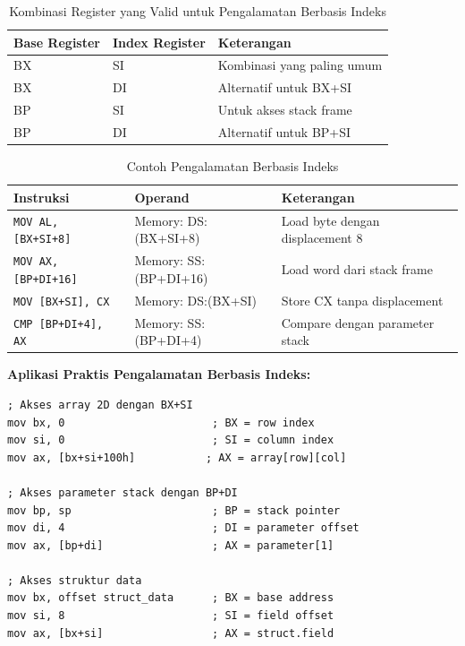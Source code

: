 \documentclass[../main.tex]{subfiles}
\begin{document}
\begin{table}[h]
\centering
\caption{Kombinasi Register yang Valid untuk Pengalamatan Berbasis Indeks}
\begin{tabular}{|p{3cm}|p{3cm}|p{9cm}|}
\hline
\textbf{Base Register} & \textbf{Index Register} & \textbf{Keterangan} \\
\hline
BX & SI & Kombinasi yang paling umum \\
\hline
BX & DI & Alternatif untuk BX+SI \\
\hline
BP & SI & Untuk akses stack frame \\
\hline
BP & DI & Alternatif untuk BP+SI \\
\hline
\end{tabular}
\label{tab:indexed-addressing-combinations}
\end{table}

\begin{table}[h]
\centering
\caption{Contoh Pengalamatan Berbasis Indeks}
\begin{tabular}{|p{4cm}|p{4cm}|p{7cm}|}
\hline
\textbf{Instruksi} & \textbf{Operand} & \textbf{Keterangan} \\
\hline
\texttt{MOV AL, [BX+SI+8]} & Memory: DS:(BX+SI+8) & Load byte dengan displacement 8 \\
\hline
\texttt{MOV AX, [BP+DI+16]} & Memory: SS:(BP+DI+16) & Load word dari stack frame \\
\hline
\texttt{MOV [BX+SI], CX} & Memory: DS:(BX+SI) & Store CX tanpa displacement \\
\hline
\texttt{CMP [BP+DI+4], AX} & Memory: SS:(BP+DI+4) & Compare dengan parameter stack \\
\hline
\end{tabular}
\label{tab:indexed-addressing-examples}
\end{table}

\textbf{Aplikasi Praktis Pengalamatan Berbasis Indeks:}
\begin{lstlisting}[language={[x86masm]Assembler}, caption=Aplikasi Praktis Pengalamatan Berbasis Indeks, label=lst:indexed-applications]
; Akses array 2D dengan BX+SI
mov bx, 0                       ; BX = row index
mov si, 0                       ; SI = column index
mov ax, [bx+si+100h]           ; AX = array[row][col]

; Akses parameter stack dengan BP+DI
mov bp, sp                      ; BP = stack pointer
mov di, 4                       ; DI = parameter offset
mov ax, [bp+di]                 ; AX = parameter[1]

; Akses struktur data
mov bx, offset struct_data      ; BX = base address
mov si, 8                       ; SI = field offset
mov ax, [bx+si]                 ; AX = struct.field
\end{lstlisting}
\end{document}
